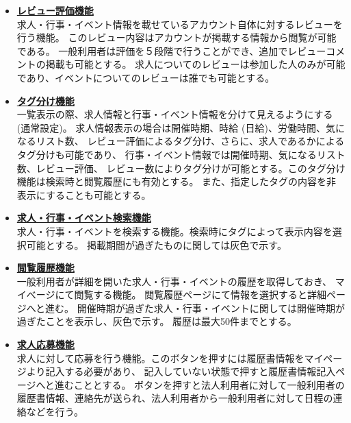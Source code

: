 \documentclass[a4paper,dvipdfmx]{jarticle}
\begin{document}
\begin{itemize}
\begin{itemize}
                  気になる求人や行事・イベントを気になるリストへと入れる機能。
                  入れる方法は一覧または詳細画面にて行う。気になるリストの確認はマイページで行うことが可能であり、気になるリストに入っている行事・イベントが近づくと通知を行う。
              \item[-] \underline{\textbf{レビュー評価機能}}\\
                  求人・行事・イベント情報を載せているアカウント自体に対するレビューを行う機能。
                  このレビュー内容はアカウントが掲載する情報から閲覧が可能である。
                  一般利用者は評価を５段階で行うことができ、追加でレビューコメントの掲載も可能とする。
                  求人についてのレビューは参加した人のみが可能であり、イベントについてのレビューは誰でも可能とする。
              \item[-] \underline{\textbf{タグ分け機能}}\\
                  一覧表示の際、求人情報と行事・イベント情報を分けて見えるようにする (通常設定)。
                  求人情報表示の場合は開催時期、時給 (日給)、労働時間、気になるリスト数、
                  レビュー評価によるタグ分け、さらに、求人であるかによるタグ分けも可能であり、
                  行事・イベント情報では開催時期、気になるリスト数、レビュー評価、
                  レビュー数によりタグ分けが可能とする。このタグ分け機能は検索時と閲覧履歴にも有効とする。
                  また、指定したタグの内容を非表示にすることも可能とする。
              \item[-] \underline{\textbf{求人・行事・イベント検索機能}}\\
                  求人・行事・イベントを検索する機能。検索時にタグによって表示内容を選択可能とする。
                  掲載期間が過ぎたものに関しては灰色で示す。
              \item[-] \underline{\textbf{閲覧履歴機能}}\\
                  一般利用者が詳細を開いた求人・行事・イベントの履歴を取得しておき、
                  マイべージにて閲覧する機能。
                  閲覧履歴ページにて情報を選択すると詳細ページへと進む。
                  開催時期が過ぎた求人・行事・イベントに関しては開催時期が過ぎたことを表示し、灰色で示す。
                  履歴は最大50件までとする。
              \item[-] \underline{\textbf{求人応募機能}}\\
                  求人に対して応募を行う機能。このボタンを押すには履歴書情報をマイページより記入する必要があり、
                  記入していない状態で押すと履歴書情報記入ページへと進むこととする。
                  ボタンを押すと法人利用者に対して一般利用者の履歴書情報、連絡先が送られ、法人利用者から一般利用者に対して日程の連絡などを行う。
          \end{itemize}
\end{itemize}
\end{document}
